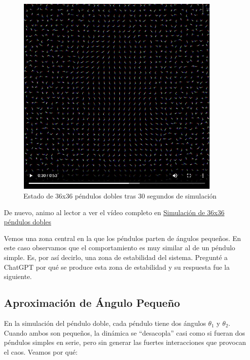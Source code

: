 \documentclass[
  10pt,
  a4paper,
  DIV=11,
  numbers=noendperiod,
  open=any]{scrreprt}
\numberwithin{equation}{chapter}
\numberwithin{equation}{section}
\renewcommand{\[}{\begin{equation}}
\renewcommand{\]}{\end{equation}}
\begin{document}
\begin{figure}[h]
  \centering
  \includegraphics[width=0.9\textwidth]{02-pendulo-doble/mapafases1.png}
  \caption{Estado de 36x36 péndulos dobles tras 30 segundos de simulación}
\end{figure}


De nuevo, animo al lector a ver el vídeo completo en \href{https://colacaos.github.io/ColaCAOS/02-pendulo-doble/MapaFase.mp4}{Simulación de 36x36 péndulos dobles}


Vemos una zona central en la que los péndulos parten de ángulos
pequeños. En este caso observamos que el comportamiento es muy similar
al de un péndulo simple. Es, por así decirlo, una zona de estabilidad
del sistema. Pregunté a ChatGPT por qué se produce esta zona de
estabilidad y su respuesta fue la siguiente.

\subsection{Aproximación de Ángulo
Pequeño}\label{aproximaciuxf3n-de-uxe1ngulo-pequeuxf1o}

En la simulación del péndulo doble, cada péndulo tiene dos ángulos
\(\theta_1\) y \(\theta_2\). Cuando ambos son pequeños, la dinámica se
``desacopla'' casi como si fueran dos péndulos simples en serie, pero
sin generar las fuertes interacciones que provocan el caos. Veamos por
qué:
\end{document}
